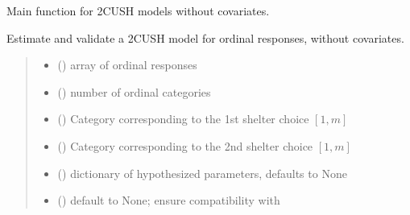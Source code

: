 \documentclass[letterpaper,10pt,english]{sphinxmanual}
\begin{document}

\begin{fulllineitems}
\label{\detokenize{cubmods:cubmods.cush2.mle}}
\pysigstartsignatures
{}
\pysigstopsignatures
\sphinxAtStartPar
Main function for 2\sphinxhyphen{}CUSH models without covariates.

\sphinxAtStartPar
Estimate and validate a 2\sphinxhyphen{}CUSH model for ordinal responses, without covariates.
\begin{quote}\begin{description}
\begin{itemize}
\item {} 
\sphinxAtStartPar
{} () \textendash{} array of ordinal responses

\item {} 
\sphinxAtStartPar
{} () \textendash{} number of ordinal categories

\item {} 
\sphinxAtStartPar
{} () \textendash{} Category corresponding to the 1st shelter choice \([1,m]\)

\item {} 
\sphinxAtStartPar
{} () \textendash{} Category corresponding to the 2nd shelter choice \([1,m]\)

\item {} 
\sphinxAtStartPar
{} (\sphinxstyleliteralemphasis{\sphinxupquote{, }}) \textendash{} dictionary of hypothesized parameters, defaults to None

\item {} 
\sphinxAtStartPar
{} () \textendash{} default to None; ensure compatibility with 


\end{itemize}
\end{description}
\end{quote}
\end{fulllineitems}
\end{document}
